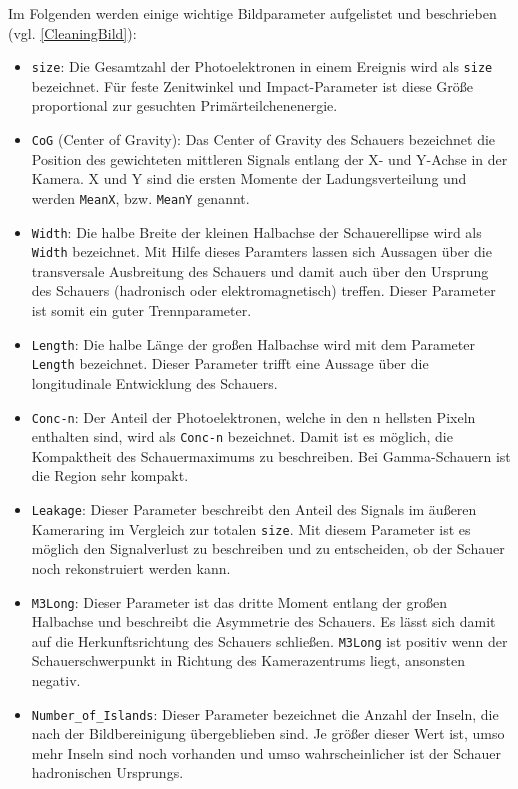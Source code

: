 Im Folgenden werden einige wichtige Bildparameter aufgelistet und beschrieben (vgl. \autoref{CleaningBild}):

\begin{itemize}
 \item \texttt{size}: Die Gesamtzahl der Photoelektronen in einem Ereignis wird als \texttt{size} bezeichnet. Für feste Zenitwinkel und Impact-Parameter ist diese Größe proportional zur gesuchten Primärteilchenenergie.
 \item \texttt{CoG} (Center of Gravity): Das Center of Gravity des Schauers bezeichnet die Position des gewichteten mittleren Signals entlang der X- und Y-Achse in der Kamera. 
 X und Y sind die ersten Momente der Ladungsverteilung und werden \texttt{MeanX}, bzw. \texttt{MeanY} genannt.
 \item \texttt{Width}: Die halbe Breite der kleinen Halbachse der Schauerellipse wird als \texttt{Width} bezeichnet. 
 Mit Hilfe dieses Paramters lassen sich Aussagen über die transversale Ausbreitung des Schauers und damit auch über den Ursprung des Schauers (hadronisch oder elektromagnetisch) treffen. 
 Dieser Parameter ist somit ein guter Trennparameter.
 \item \texttt{Length}: Die halbe Länge der großen Halbachse wird mit dem Parameter \texttt{Length} bezeichnet.
 Dieser Parameter trifft eine Aussage über die longitudinale Entwicklung des Schauers.
 \item \texttt{Conc-n}: Der Anteil der Photoelektronen, welche in den n hellsten Pixeln enthalten sind, wird als \texttt{Conc-n} bezeichnet.
 Damit ist es möglich, die Kompaktheit des Schauermaximums zu beschreiben. 
 Bei Gamma-Schauern ist die Region sehr kompakt.
 \item \texttt{Leakage}: Dieser Parameter beschreibt den Anteil des Signals im äußeren Kameraring im Vergleich zur totalen \texttt{size}.
 Mit diesem Parameter ist es möglich den Signalverlust zu beschreiben und zu entscheiden, ob der Schauer noch rekonstruiert werden kann.
 \item \texttt{M3Long}: Dieser Parameter ist das dritte Moment entlang der großen Halbachse und beschreibt die Asymmetrie des Schauers.
 Es lässt sich damit auf die Herkunftsrichtung des Schauers schließen. 
 \texttt{M3Long} ist positiv wenn der Schauerschwerpunkt in Richtung des Kamerazentrums liegt, ansonsten negativ.
 \item \texttt{Number\_of\_Islands}: Dieser Parameter bezeichnet die Anzahl der Inseln, die nach der Bildbereinigung übergeblieben sind. 
 Je größer dieser Wert ist, umso mehr Inseln sind noch vorhanden und umso wahrscheinlicher ist der Schauer hadronischen Ursprungs.
\end{itemize}

